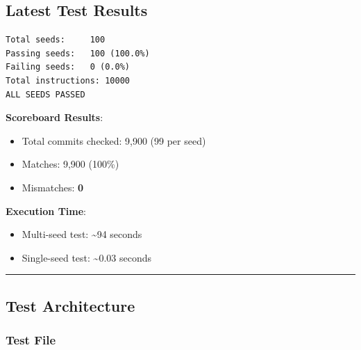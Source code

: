 \subsection{Latest Test Results}\label{cr:status:random-tests-status:latest-test-results}

\begin{record}

\begin{lstlisting}[language={}]
Total seeds:     100
Passing seeds:   100 (100.0%)
Failing seeds:   0 (0.0%)
Total instructions: 10000
ALL SEEDS PASSED
\end{lstlisting}

\textbf{Scoreboard Results}:

\begin{itemize}
\tightlist
\item
  Total commits checked: 9,900 (99 per seed)
\item
  Matches: 9,900 (100\%)
\item
  Mismatches: \textbf{0} \ok{}
\end{itemize}

\textbf{Execution Time}:

\begin{itemize}
\tightlist
\item
  Multi-seed test: \textasciitilde94 seconds
\item
  Single-seed test: \textasciitilde0.03 seconds
\end{itemize}

\begin{center}\rule{0.5\linewidth}{0.5pt}\end{center}

\end{record}

\subsection{Test Architecture}\label{cr:status:random-tests-status:test-architecture}

\subsubsection{Test File}\label{cr:status:random-tests-status:test-file}

\begin{record}


\end{record}

